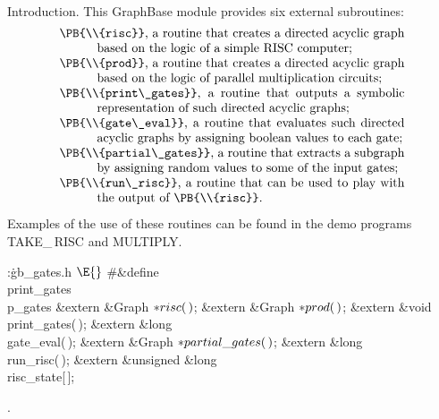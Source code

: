 Introduction. This GraphBase module provides six external subroutines:
$$\vbox{\hsize=.8\hsize \everypar{\hangindent3em}
\noindent\PB{\\{risc}}, a routine that creates a directed acyclic graph based
on the
logic of a simple RISC computer;\par
\noindent\PB{\\{prod}}, a routine that creates a directed acyclic graph based
on the
logic of parallel multiplication circuits;\par
\noindent\PB{\\{print\_gates}}, a routine that outputs a symbolic
representation of
such directed acyclic graphs;\par
\noindent\PB{\\{gate\_eval}}, a routine that evaluates such directed acyclic
graphs by
assigning boolean values to each gate;\par
\noindent\PB{\\{partial\_gates}}, a routine that extracts a subgraph by
assigning
random values to some of the input gates;\par
\noindent\PB{\\{run\_risc}}, a routine that can be used to play with the output
of \PB{\\{risc}}.}$$
Examples of the use of these routines can be found in the demo programs
{\sc TAKE\_\,RISC} and {\sc MULTIPLY}.

\Y\B\4:\.{gb\_gates.h }\X${}\E{}$\6
\8\#\&{define} \\{print\_gates}\5\\{p\_gates}\6
\&{extern} \&{Graph} ${}{*}\\{risc}(\,){}$;\6
\&{extern} \&{Graph} ${}{*}\\{prod}(\,){}$;\6
\&{extern} \&{void} \\{print\_gates}(\,);\6
\&{extern} \&{long} \\{gate\_eval}(\,);\6
\&{extern} \&{Graph} ${}{*}\\{partial\_gates}(\,){}$;\6
\&{extern} \&{long} \\{run\_risc}(\,);\6
\&{extern} \&{unsigned} \&{long} \\{risc\_state}[\,];\par
{}.\fi

